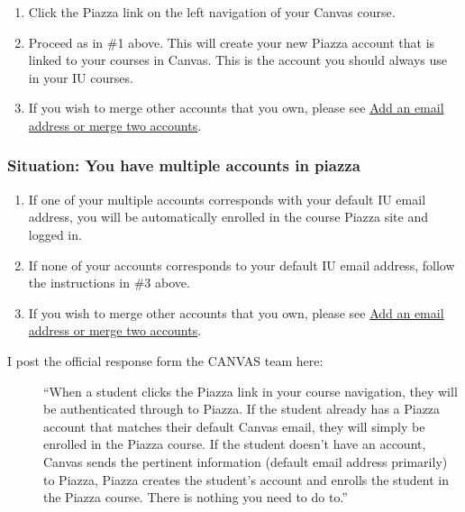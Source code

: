\begin{enumerate}
\tightlist
\item
  Click the Piazza link on the left navigation of your Canvas course.
\item
  Proceed as in \#1 above. This will create your new Piazza account that
  is linked to your courses in Canvas. This is the account you should
  always use in your IU courses.
\item
  If you wish to merge other accounts that you own, please see
  \href{https://www.google.com/url?q=http://support.piazza.com/customer/portal/articles/1646661-add-an-email-address-or-merge-two-accounts\&sa=D\&ust=1502127148503000\&usg=AFQjCNHyBFh3TMAtSDpFordYOfH0IE6kPA}{Add
  an email address or merge two accounts}.
\end{enumerate}

\subsubsection{Situation: You have multiple accounts in
piazza}\label{situation-you-have-multiple-accounts-in-piazza}

\begin{enumerate}
\tightlist
\item
  If one of your multiple accounts corresponds with your default IU
  email address, you will be automatically enrolled in the course Piazza
  site and logged in.
\item
  If none of your accounts corresponds to your default IU email address,
  follow the instructions in \#3 above.
\item
  If you wish to merge other accounts that you own, please see
  \href{https://www.google.com/url?q=http://support.piazza.com/customer/portal/articles/1646661-add-an-email-address-or-merge-two-accounts\&sa=D\&ust=1502127148504000\&usg=AFQjCNHwO1kks2cnVLpWWCnOIEDFhl2fJA}{Add
  an email address or merge two accounts}.
\end{enumerate}

\begin{description}
\item[I post the official response form the CANVAS team here:]
``When a student clicks the Piazza link in your course navigation, they
will be authenticated through to Piazza. If the student already has a
Piazza account that matches their default Canvas email, they will simply
be enrolled in the Piazza course. If the student doesn't have an
account, Canvas sends the pertinent information (default email address
primarily) to Piazza, Piazza creates the student's account and enrolls
the student in the Piazza course. There is nothing you need to do to.''
\end{description}

